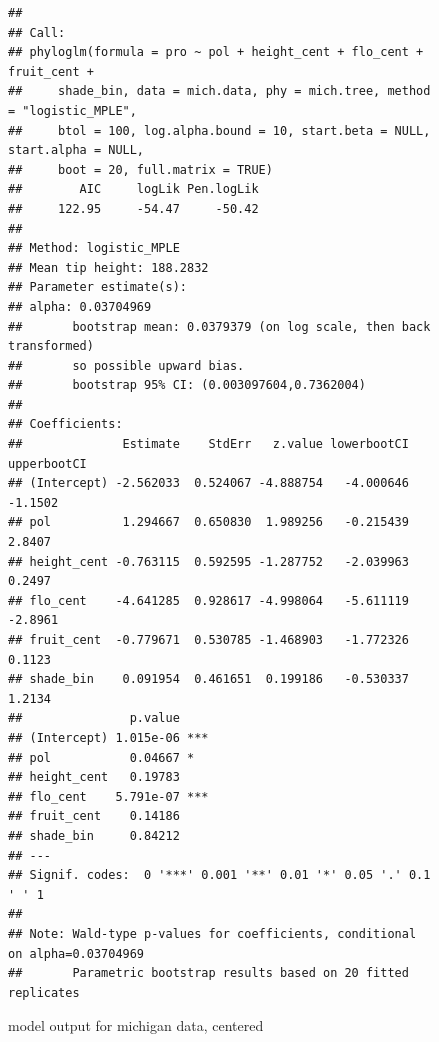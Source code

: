 \documentclass{article}\usepackage[]{graphicx}\usepackage[]{color}
\makeatletter
\newenvironment{kframe}{%
 \def\at@end@of@kframe{}%
 \ifinner\ifhmode%
  \def\at@end@of@kframe{\end{minipage}}%
  \begin{minipage}{\columnwidth}%
 \fi\fi%
 \def\FrameCommand##1{\hskip\@totalleftmargin \hskip-\fboxsep
 \colorbox{shadecolor}{##1}\hskip-\fboxsep
     \hskip-\linewidth \hskip-\@totalleftmargin \hskip\columnwidth}%
 \MakeFramed {\advance\hsize-\width
   \@totalleftmargin\z@ \linewidth\hsize
   \@setminipage}}%
 {\par\unskip\endMakeFramed%
 \at@end@of@kframe}
\newenvironment{knitrout}{}{} %
\makeatother
\begin{document}
\begin{figure}[h!]
\begin{knitrout}
\color{fgcolor}\begin{kframe}
\begin{verbatim}
## 
## Call:
## phyloglm(formula = pro ~ pol + height_cent + flo_cent + fruit_cent + 
##     shade_bin, data = mich.data, phy = mich.tree, method = "logistic_MPLE", 
##     btol = 100, log.alpha.bound = 10, start.beta = NULL, start.alpha = NULL, 
##     boot = 20, full.matrix = TRUE)
##        AIC     logLik Pen.logLik 
##     122.95     -54.47     -50.42 
## 
## Method: logistic_MPLE
## Mean tip height: 188.2832
## Parameter estimate(s):
## alpha: 0.03704969 
##       bootstrap mean: 0.0379379 (on log scale, then back transformed)
##       so possible upward bias.
##       bootstrap 95% CI: (0.003097604,0.7362004)
## 
## Coefficients:
##              Estimate    StdErr   z.value lowerbootCI upperbootCI
## (Intercept) -2.562033  0.524067 -4.888754   -4.000646     -1.1502
## pol          1.294667  0.650830  1.989256   -0.215439      2.8407
## height_cent -0.763115  0.592595 -1.287752   -2.039963      0.2497
## flo_cent    -4.641285  0.928617 -4.998064   -5.611119     -2.8961
## fruit_cent  -0.779671  0.530785 -1.468903   -1.772326      0.1123
## shade_bin    0.091954  0.461651  0.199186   -0.530337      1.2134
##               p.value    
## (Intercept) 1.015e-06 ***
## pol           0.04667 *  
## height_cent   0.19783    
## flo_cent    5.791e-07 ***
## fruit_cent    0.14186    
## shade_bin     0.84212    
## ---
## Signif. codes:  0 '***' 0.001 '**' 0.01 '*' 0.05 '.' 0.1 ' ' 1
## 
## Note: Wald-type p-values for coefficients, conditional on alpha=0.03704969
##       Parametric bootstrap results based on 20 fitted replicates
\end{verbatim}
\end{kframe}
\end{knitrout}
\caption{model output for michigan data, centered}
\end{figure}
\end{document}
